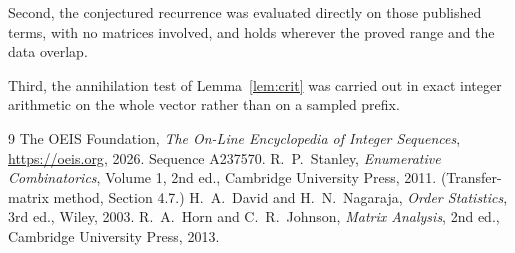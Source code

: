 \documentclass[11pt,a4paper]{article}
\theoremstyle{plain}
\theoremstyle{definition}
\begin{document}
Second, the conjectured recurrence was evaluated directly on those published terms, with no
matrices involved, and holds wherever the proved range and the data overlap.

Third, the annihilation test of Lemma~\ref{lem:crit} was carried out in exact integer
arithmetic on the whole vector rather than on a sampled prefix.

\begin{thebibliography}{9}
 The OEIS Foundation, \emph{The On-Line Encyclopedia of Integer
Sequences}, \url{https://oeis.org}, 2026. Sequence A237570.
 R.~P.~Stanley, \emph{Enumerative Combinatorics}, Volume 1, 2nd ed.,
Cambridge University Press, 2011. (Transfer-matrix method, Section 4.7.)
 H.~A.~David and H.~N.~Nagaraja, \emph{Order Statistics}, 3rd ed., Wiley,
2003.
 R.~A.~Horn and C.~R.~Johnson, \emph{Matrix Analysis}, 2nd ed., Cambridge
University Press, 2013.
\end{thebibliography}
\end{document}
